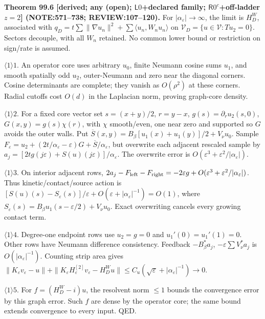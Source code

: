 \textbf{Theorem 99.6 [derived; any (open); \(\mathsf L0\)+declared family; \(\mathsf R0^c\)+off-ladder \(z=2\)]
(NOTE:571--738; REVIEW:107--120).}
For \(|\alpha_\varepsilon|\to\infty\), the limit is \(H_D^W\), associated with
\(q_D=t\sum\|\nabla u_n\|^2+\sum\langle u_n,W_nu_n\rangle\) on \(\mathcal V_D=\{u\in\mathcal V:Tu_2=0\}\).
Sectors decouple, with all \(W_n\) retained. No common lower bound or restriction on sign/rate is assumed.
\par\(\langle1\rangle1\). An operator core uses arbitrary \(u_0\), finite Neumann cosine sums \(u_1\), and smooth spatially
odd \(u_2\), outer-Neumann and zero near the diagonal corners. Cosine determinants are complete; they vanish
as \(O(\rho^2)\) at these corners. Radial cutoffs cost \(O(d)\) in the Laplacian norm, proving graph-core density.
\par\(\langle1\rangle2\). For a fixed core vector set \(s=(x+y)/2\), \(r=y-x\), \(g(s)=\partial_ru_2(s,0)\),
\(G(x,y)=g(s)\chi(r)\), with \(\chi\) smooth/even, one near zero and supported so \(G\) avoids the outer walls.
Put \(\overline S(x,y)=B_\beta[u_1(x)+u_1(y)]/2+V_\nu u_0\). Sample
\(F_\varepsilon=u_2+(2t/\alpha_\varepsilon-\varepsilon)G+\overline S/\alpha_\varepsilon\), but overwrite each adjacent rescaled
sample by \(a_j=[2tg(j\varepsilon)+S(u)(j\varepsilon)]/\alpha_\varepsilon\). The overwrite error is \(O(\varepsilon^3+\varepsilon^2/|\alpha_\varepsilon|)\).
\par\(\langle1\rangle3\). On interior adjacent rows, \(2a_j-F_{\rm left}-F_{\rm right}=-2\varepsilon g+O(\varepsilon^3+\varepsilon^2/|\alpha_\varepsilon|)\).
Thus kinetic/contact/source action is \([S(u)(s)-S_\varepsilon(s)]/\varepsilon+O(\varepsilon+|\alpha_\varepsilon|^{-1})=O(1)\),
where \(S_\varepsilon(s)=B_\beta u_1(s-\varepsilon/2)+V_\nu u_0\). Exact overwriting cancels every growing contact term.
\par\(\langle1\rangle4\). Degree-one endpoint rows use \(u_2=g=0\) and \(u_1'(0)=u_1'(1)=0\). Other rows have
Neumann difference consistency. Feedback \(-B_\beta^*a_j\), \(-\varepsilon\sum V_\nu^*a_j\) is \(O(|\alpha_\varepsilon|^{-1})\).
Counting strip area gives \(\|K_\varepsilon v_\varepsilon-u\|+\|K_\varepsilon H_\varepsilon^{[2]}v_\varepsilon-H_D^Wu\|
\le C_u(\sqrt\varepsilon+|\alpha_\varepsilon|^{-1})\to0\).
\par\(\langle1\rangle5\). For \(f=(H_D^W-i)u\), the resolvent norm \(\le1\) bounds the convergence error by this graph error.
Such \(f\) are dense by the operator core; the same bound extends convergence to every input. QED.

